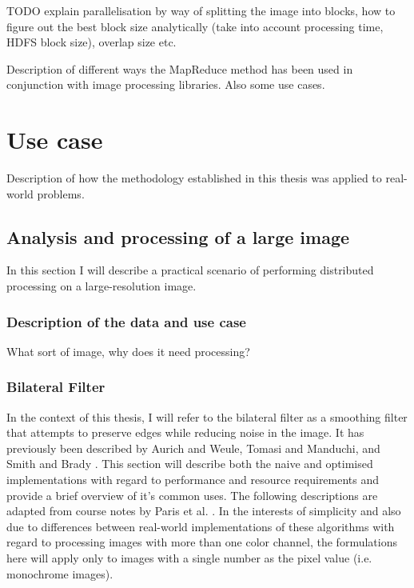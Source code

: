 \documentclass [12pt,a4paper]{report}
\begin{document}
TODO explain parallelisation by way of splitting the image into blocks, how to figure out the best block size analytically (take into account processing time, HDFS block size), overlap size etc.

Description of different ways the MapReduce method has been used in conjunction with image processing libraries. Also some use cases.


\chapter{Use case}
Description of how the methodology established in this thesis was applied to real-world problems.

\section{Analysis and processing of a large image}

In this section I will describe a practical scenario of performing distributed processing on a large-resolution image.

\subsection{Description of the data and use case}



What sort of image, why does it need processing?



\subsection{Bilateral Filter}

In the context of this thesis, I will refer to the bilateral filter as a smoothing filter that attempts to preserve edges while reducing noise in the image. It has previously been described by Aurich and Weule, Tomasi and Manduchi, and Smith and Brady \cite{aurich1995non,smith1997susan,tomasi1998bilateral}. This section will describe both the naive and optimised implementations with regard to performance and resource requirements and provide a brief overview of it's common uses. The following descriptions are adapted from course notes by Paris et al. \cite{bf_course}. In the interests of simplicity and also due to differences between real-world implementations of these algorithms with regard to processing images with more than one color channel, the formulations here will apply only to images with a single number as the pixel value (i.e. monochrome images).
\end{document}
